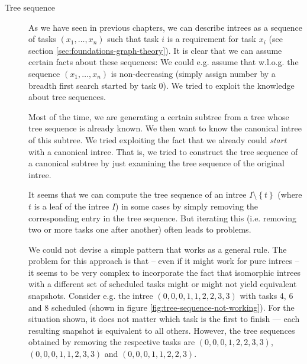 \begin{description}
\item[Tree sequence] As we have seen in previous chapters, we can describe intrees as a sequence of tasks $(x_1,\dots,x_n)$ such that task $i$ is a requirement for task $x_i$ (see section \ref{sec:foundations-graph-theory}). It is clear that we can assume certain facts about these sequences: We could e.g. assume that w.l.o.g. the sequence $(x_1,\dots,x_n)$ is non-decreasing (simply assign number by a breadth first search started by task 0). We tried to exploit the knowledge about tree sequences.

Most of the time, we are generating a certain subtree from a tree whose tree sequence is already known. We then want to know the canonical intree of this subtree. We tried exploiting the fact that we already could \emph{start} with a canonical intree. That is, we tried to construct the tree sequence of a canonical subtree by just examining the tree sequence of the original intree. 

It seems that we can compute the tree sequence of an intree $I\setminus \left\{ t \right\}$ (where $t$ is a leaf of the intree $I$) in some cases by simply removing the corresponding entry in the tree sequence. But iterating this (i.e. removing two or more tasks one after another) often leads to problems.

We could not devise a simple pattern that works as a general rule. The problem for this approach is that -- even if it might work for pure intrees -- it seems to be very complex to incorporate the fact that isomorphic intrees with a different set of scheduled tasks might or might not yield equivalent snapshots. Consider e.g. the intree $(0,0,0,1,1,2,2,3,3)$ with tasks 4, 6 and 8 scheduled (shown in figure \ref{fig:tree-sequence-not-working}). For the situation shown, it does not matter which task is the first to finish --- each resulting snapshot is equivalent to all others. However, the tree sequences obtained by removing the respective tasks are $(0,0,0,1,2,2,3,3)$, $(0,0,0,1,1,2,3,3)$ and $(0,0,0,1,1,2,2,3)$.


\end{description}

